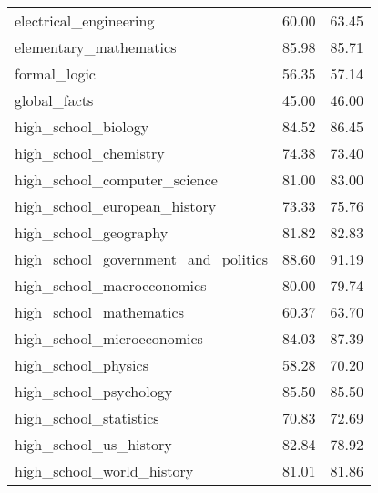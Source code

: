 \begin{table}[t]
\begin{tabular}{L{0.35}C{0.20}C{0.20}}
        electrical\_engineering                 & 60.00                    & 63.45                      \\
        elementary\_mathematics                 & 85.98                    & 85.71                      \\
        formal\_logic                           & 56.35                    & 57.14                      \\
        global\_facts                           & 45.00                    & 46.00                      \\
        high\_school\_biology                   & 84.52                    & 86.45                      \\
        high\_school\_chemistry                 & 74.38                    & 73.40                      \\
        high\_school\_computer\_science         & 81.00                    & 83.00                      \\
        high\_school\_european\_history         & 73.33                    & 75.76                      \\
        high\_school\_geography                 & 81.82                    & 82.83                      \\
        high\_school\_government\_and\_politics & 88.60                    & 91.19                      \\
        high\_school\_macroeconomics            & 80.00                    & 79.74                      \\
        high\_school\_mathematics               & 60.37                    & 63.70                      \\
        high\_school\_microeconomics            & 84.03                    & 87.39                      \\
        high\_school\_physics                   & 58.28                    & 70.20                      \\
        high\_school\_psychology                & 85.50                    & 85.50                      \\
        high\_school\_statistics                & 70.83                    & 72.69                      \\
        high\_school\_us\_history               & 82.84                    & 78.92                      \\
        high\_school\_world\_history            & 81.01                    & 81.86                      \\

\end{tabular}
\end{table}
